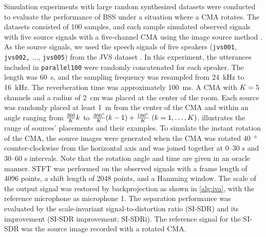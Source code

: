 \documentclass[sip,biber]{now-journal}
\begin{document}
Simulation experiments with large random synthesized datasets were conducted to evaluate the performance of BSS under a situation where a CMA rotates.
The datasets consisted of 100 samples, and each sample simulated observed signals with five source signals with a five-channel CMA using the image source method \cite{Allen:1979:JASA}.
As the source signals, we used the speech signals of five speakers (\texttt{jvs001}, \texttt{jvs002,} $\hdots$, \texttt{jvs005}) from the JVS dataset \cite{Takamichi:2019:arxiv}.
In this experiment, the utterances included in \texttt{parallel100} were randomly concatenated for each speaker.
The length was \SI{60}{\second}, and the sampling frequency was resampled from \SI{24}{\kilo\hertz} to \SI{16}{\kilo\hertz}.
The reverberation time was approximately \SI{100}{\milli\second}.
A CMA with $K = 5$ channels and a radius of \SI{2}{\centi\metre} was placed at the center of the room.
Each source was randomly placed at least \SI{1}{\metre} from the center of the CMA and within an angle ranging from $\frac{360}{K} k$ to $\frac{360\si{\degree}}{K} (k - 1) + \frac{180\si{\degree}}{K}\; (k = 1, \dots, K)$.
 illustrates the range of sources' placements and their examples.
To simulate the instant rotation of the CMA, the source images were generated when the CMA was rotated \SI{40}{\degree} counter-clockwise from the horizontal axis and was joined together at 0--30 \si{\second} and 30--60 \si{\second} intervals.
Note that the rotation angle and time are given in an oracle manner.
STFT was performed on the observed signals with a frame length of 4096 points, a shift length of 2048 points, and a Hamming window.
The scale of the output signal was restored by backprojection as shown in \cref{alg:iva}, with the reference microphone as microphone 1.
The separation performance was evaluated by the scale-invariant signal-to-distortion ratio (SI-SDR) \cite{LeRoux:2019:ICASSP} and its improvement (SI-SDR improvement; SI-SDRi).
The reference signal for the SI-SDR was the source image recorded with a rotated CMA.
\end{document}
